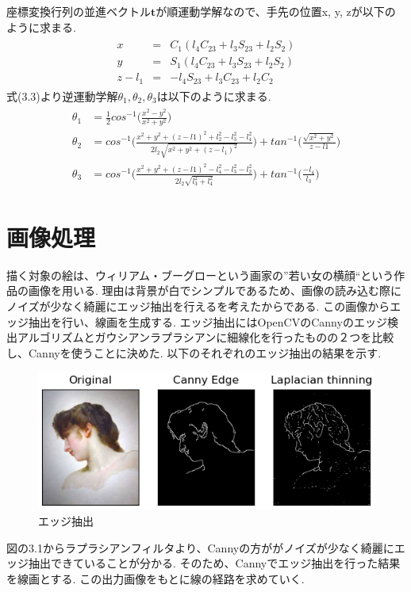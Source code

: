 	座標変換行列の並進ベクトル$\boldsymbol{t}$が順運動学解なので、手先の位置x, y, zが以下のように求まる.
	\begin{equation}
			\begin{array}{c}
			\begin{split}
				x &=& C_1(l_4C_{23} + l_3S_{23} + l_2S_2) \\
				y &=& S_1(l_4C_{23} + l_3S_{23} + l_2S_2) \\
				z - l_1 &=& -l_4S_{23} + l_3C_{23} + l_2C_2
			\end{split}
		\end{array}
	\end{equation}
	式(3.3)より逆運動学解$\theta_1, \theta_2, \theta_3$は以下のように求まる.
	\begin{equation}
			\begin{array}{c}
			\begin{split}
				\theta_1  &  =\frac{1}{2}  cos^{-1}\biggl( \frac{x^2-y^2}{x^2+y^2} \biggr) \\
				\theta_2 & = cos^{-1}\biggl( \frac{x^2+y^2+(z-l1)^2 + l_2^2-l_3^2-l_4^2}{2l_2\sqrt{x^2+y^2+(z-l_1)^2}} \biggr) + tan^{-1}\biggl( \frac{\sqrt{x^2+y^2}}{z-l1}\biggr) \\
				\theta_3 & =cos^{-1}\biggl( \frac{x^2+y^2+(z-l1)^2 - l_4^2-l_3^2-l_2^2}{2l_2\sqrt{l_3^2+l_4^2}}\biggr) + tan^{-1}\biggl( \frac{-l_4}{l_3}\biggr)
			\end{split}
			\end{array}
	\end{equation}
	\section{画像処理}
	描く対象の絵は、ウィリアム・ブーグローという画家の''若い女の横顔``という作品の画像を用いる. 理由は背景が白でシンプルであるため、画像の読み込む際にノイズが少なく綺麗にエッジ抽出を行えるを考えたからである. この画像からエッジ抽出を行い、線画を生成する. エッジ抽出にはOpenCVのCannyのエッジ検出アルゴリズムとガウシアンラプラシアンに細線化を行ったものの２つを比較し、Cannyを使うことに決めた. 以下のそれぞれのエッジ抽出の結果を示す. 
	 \begin{center}
        \begin{figure}[h]
            \includegraphics[width=1.0\textwidth]{./img/001.png}
            \caption{エッジ抽出}
            \label{manipulator}
        \end{figure}
    \end{center}
	図の3.1からラプラシアンフィルタより、Cannyの方ががノイズが少なく綺麗にエッジ抽出できていることが分かる. そのため、Cannyでエッジ抽出を行った結果を線画とする. この出力画像をもとに線の経路を求めていく.

